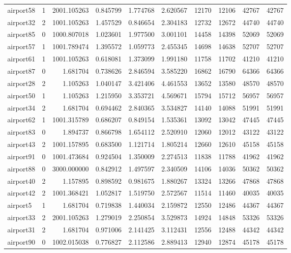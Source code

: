 \begin{longtable}{|l|r|r|r|r|r|r|r|r|r|}
airport58 & 1 & 2001.105263 & 0.845799 & 1.774768 & 2.620567 & 12170 & 12106 & 42767 & 42767 \\
airport32 & 2 & 1001.105263 & 1.457529 & 0.846654 & 2.304183 & 12732 & 12672 & 44740 & 44740 \\
airport85 & 0 & 1000.807018 & 1.023601 & 1.977500 & 3.001101 & 14458 & 14398 & 52069 & 52069 \\
airport57 & 1 & 1001.789474 & 1.395572 & 1.059773 & 2.455345 & 14698 & 14638 & 52707 & 52707 \\
airport61 & 1 & 1001.105263 & 0.618081 & 1.373099 & 1.991180 & 11758 & 11702 & 41210 & 41210 \\
airport87 & 0 & 1.681704 & 0.738626 & 2.846594 & 3.585220 & 16862 & 16790 & 64366 & 64366 \\
airport28 & 2 & 1.105263 & 1.040147 & 3.421406 & 4.461553 & 13652 & 13580 & 48570 & 48570 \\
airport50 & 1 & 1.105263 & 1.215950 & 3.353721 & 4.569671 & 15794 & 15712 & 56957 & 56957 \\
airport34 & 2 & 1.681704 & 0.694462 & 2.840365 & 3.534827 & 14140 & 14088 & 51991 & 51991 \\
airport62 & 1 & 1001.315789 & 0.686207 & 0.849154 & 1.535361 & 13092 & 13042 & 47445 & 47445 \\
airport83 & 0 & 1.894737 & 0.866798 & 1.654112 & 2.520910 & 12060 & 12012 & 43122 & 43122 \\
airport43 & 2 & 1001.157895 & 0.683500 & 1.121714 & 1.805214 & 12660 & 12610 & 45158 & 45158 \\
airport91 & 0 & 1001.473684 & 0.924504 & 1.350009 & 2.274513 & 11838 & 11788 & 41962 & 41962 \\
airport88 & 0 & 3000.000000 & 0.842912 & 1.497597 & 2.340509 & 14106 & 14036 & 50362 & 50362 \\
airport40 & 2 & 1.157895 & 0.898592 & 0.981675 & 1.880267 & 13324 & 13266 & 47868 & 47868 \\
airport42 & 2 & 1001.368421 & 1.052817 & 1.519750 & 2.572567 & 11514 & 11460 & 40035 & 40035 \\
airport5 & 1 & 1.681704 & 0.719838 & 1.440034 & 2.159872 & 12550 & 12486 & 44367 & 44367 \\
airport33 & 2 & 2001.105263 & 1.279019 & 2.250854 & 3.529873 & 14924 & 14848 & 53326 & 53326 \\
airport31 & 2 & 1.681704 & 0.971006 & 2.141425 & 3.112431 & 12556 & 12488 & 44342 & 44342 \\
airport90 & 0 & 1002.015038 & 0.776827 & 2.112586 & 2.889413 & 12940 & 12874 & 45178 & 45178 \\

\end{longtable}
